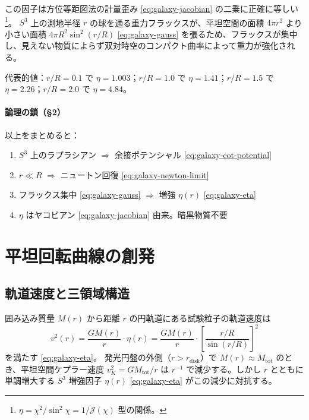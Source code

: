 \documentclass[dvipdfmx,a4paper,oneside]{jsbook}
\numberwithin{equation}{chapter}
\begin{document}
この因子は方位等距図法の計量歪み \eqref{eq:galaxy-jacobian} の二乗に正確に等しい \footnote{\(\eta = \chi^2/\sin^2\chi = 1/\mathcal{J}(\chi)\) 型の関係。}。
\(S^3\) 上の測地半径 \(r\) の球を通る重力フラックスが、平坦空間の面積 \(4\pi r^2\) より小さい面積 \(4\pi R^2 \sin^2(r/R)\) \eqref{eq:galaxy-gauss} を張るため、フラックスが集中し、見えない物質によらず双対時空のコンパクト曲率によって重力が強化される。

代表的値：\(r/R = 0.1\) で \(\eta = 1.003\)；\(r/R = 1.0\) で \(\eta = 1.41\)；\(r/R = 1.5\) で \(\eta = 2.26\)；\(r/R = 2.0\) で \(\eta = 4.84\)。

\paragraph{論理の鎖（§2）}
以上をまとめると：
\begin{enumerate}[leftmargin=2em]
  \item \(S^3\) 上のラプラシアン \(\Rightarrow\) 余接ポテンシャル \eqref{eq:galaxy-cot-potential}
  \item \(r \ll R\) \(\Rightarrow\) ニュートン回復 \eqref{eq:galaxy-newton-limit}
  \item フラックス集中 \eqref{eq:galaxy-gauss} \(\Rightarrow\) 増強 \(\eta(r)\) \eqref{eq:galaxy-eta}
  \item \(\eta\) はヤコビアン \eqref{eq:galaxy-jacobian} 由来。暗黒物質不要
\end{enumerate}

\section{平坦回転曲線の創発}

\subsection{軌道速度と三領域構造}

囲み込み質量 \(M(r)\) から距離 \(r\) の円軌道にある試験粒子の軌道速度は
\begin{equation}
  v^2(r) = \frac{GM(r)}{r} \cdot \eta(r) = \frac{GM(r)}{r} \cdot \left[\frac{r/R}{\sin(r/R)}\right]^2
  \label{eq:galaxy-v2}
\end{equation}
を満たす \eqref{eq:galaxy-eta}。
発光円盤の外側（\(r > r_{\mathrm{disk}}\)）で \(M(r) \approx M_{\mathrm{tot}}\) のとき、平坦空間ケプラー速度 \(v_K^2 = GM_{\mathrm{tot}}/r\) は \(r^{-1}\) で減少する。しかし \(r\) とともに単調増大する \(S^3\) 増強因子 \(\eta(r)\) \eqref{eq:galaxy-eta} がこの減少に対抗する。
\end{document}
